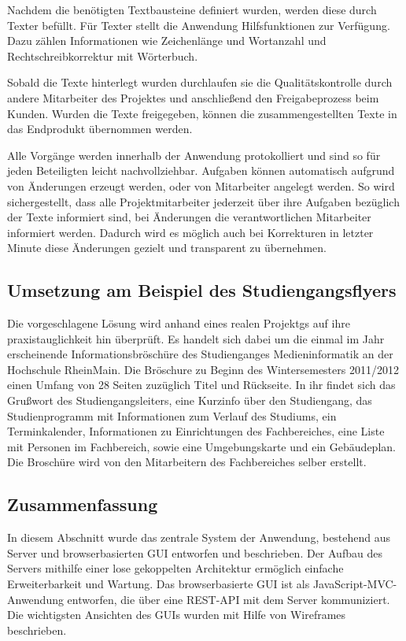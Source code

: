 Nachdem die benötigten Textbausteine definiert wurden, werden diese durch Texter befüllt. Für Texter stellt die Anwendung Hilfsfunktionen zur Verfügung. Dazu zählen Informationen wie Zeichenlänge und Wortanzahl und Rechtschreibkorrektur mit Wörterbuch.

Sobald die Texte hinterlegt wurden durchlaufen sie die Qualitätskontrolle durch andere Mitarbeiter des Projektes und anschließend den Freigabeprozess beim Kunden. Wurden die Texte freigegeben, können die zusammengestellten Texte in das Endprodukt übernommen werden. 

Alle Vorgänge werden innerhalb der Anwendung protokolliert und sind so für jeden Beteiligten leicht nachvollziehbar. Aufgaben können automatisch aufgrund von Änderungen erzeugt werden, oder von Mitarbeiter angelegt werden. So wird sichergestellt, dass alle Projektmitarbeiter jederzeit über ihre Aufgaben bezüglich der Texte informiert sind, bei Änderungen die verantwortlichen Mitarbeiter informiert werden. Dadurch wird es möglich auch bei Korrekturen in letzter Minute diese Änderungen gezielt und transparent zu übernehmen.

\subsection{Umsetzung am Beispiel des Studiengangsflyers}

Die vorgeschlagene Lösung wird anhand eines realen Projektgs auf ihre praxistauglichkeit hin überprüft. Es handelt sich dabei um die einmal im Jahr erscheinende Informationsbröschüre des Studienganges Medieninformatik an der Hochschule RheinMain. Die Bröschure zu Beginn des Wintersemesters 2011/2012 einen Umfang von 28 Seiten zuzüglich Titel und Rückseite. In ihr findet sich das Grußwort des Studiengangsleiters, eine Kurzinfo über den Studiengang, das Studienprogramm mit Informationen zum Verlauf des Studiums, ein Terminkalender, Informationen zu Einrichtungen des Fachbereiches, eine Liste mit Personen im Fachbereich, sowie eine Umgebungskarte und ein Gebäudeplan. Die Broschüre wird von den Mitarbeitern des Fachbereiches selber erstellt.

\subsection{Zusammenfassung}

In diesem Abschnitt wurde das zentrale System der Anwendung, bestehend aus Server und browserbasierten GUI entworfen und beschrieben. Der Aufbau des Servers mithilfe einer lose gekoppelten Architektur ermöglich einfache Erweiterbarkeit und Wartung. Das browserbasierte GUI ist als JavaScript-MVC-Anwendung entworfen, die über eine REST-API mit dem Server kommuniziert. Die wichtigsten Ansichten des GUIs wurden mit Hilfe von Wireframes beschrieben. 

\pagebreak
